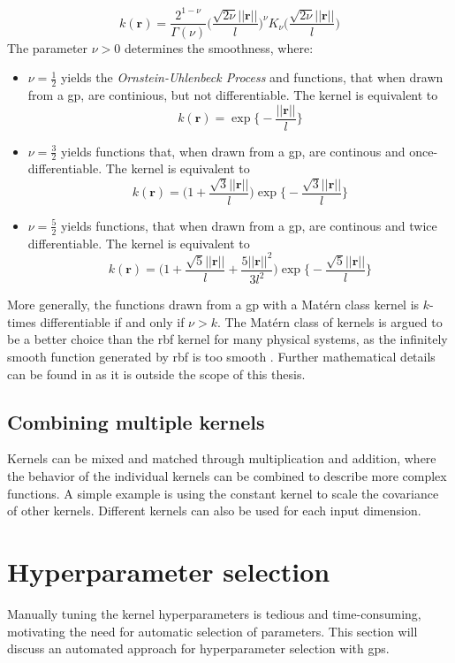 \begin{equation}\label{eq:kernel_matern}
    k(\boldsymbol{r}) = \frac{2^{1-\nu}}{\Gamma(\nu)}\bigg(\frac{\sqrt{2 \nu} ||\boldsymbol{r}||}{l} \bigg)^\nu K_\nu \bigg(\frac{\sqrt{2\nu} || \boldsymbol{r}||}{l} \bigg)
\end{equation}
The parameter $\nu > 0$ determines the smoothness, where:
\begin{itemize}
    \item $\nu=\frac{1}{2}$ yields the \textit{Ornstein-Uhlenbeck Process} and functions, that when drawn from a \acrshort{gp}, are continious, but not differentiable. The kernel is equivalent to $$k(\boldsymbol{r}) = \exp \big\{-\frac{||\boldsymbol{r}||}{l}\big\}$$
    \item $\nu=\frac{3}{2}$ yields functions that, when drawn from a \acrshort{gp}, are continous and once-differentiable. The kernel is equivalent to $$k(\boldsymbol{r}) = \big(1 + \frac{\sqrt{3} ||\boldsymbol{r}||}{l}\big) \exp\big\{- \frac{\sqrt{3} ||\boldsymbol{r}||}{l}\big\}$$
    \item $\nu=\frac{5}{2}$ yields functions, that when drawn from a \acrshort{gp},  are continous and twice differentiable. The kernel is equivalent to $$k(\boldsymbol{r}) = \big(1 + \frac{\sqrt{5} ||\boldsymbol{r}||}{l} + \frac{5 ||\boldsymbol{r}||^2}{3 l^2}\big) \exp\big\{- \frac{\sqrt{5} ||\boldsymbol{r}||}{l}\big\}$$
\end{itemize}
More generally, the functions drawn from a \acrshort{gp} with a Matérn class kernel is $k$-times differentiable if and only if $\nu > k$\cite{rasmussen}. The Matérn class of kernels is argued to be a better choice than the \acrshort{rbf} kernel for many physical systems, as the infinitely smooth function generated by \acrshort{rbf} is too smooth \cite{rasmussen}.
Further mathematical details can be found in \cite[sec.~4.2]{rasmussen} as it is outside the scope of this thesis.


\subsection{Combining multiple kernels}
Kernels can be mixed and matched through multiplication and addition, where the behavior of the individual kernels can be combined to describe more complex functions. A simple example is using the constant kernel to scale the covariance of other kernels. Different kernels can also be used for each input dimension.
\section{Hyperparameter selection}
Manually tuning the kernel hyperparameters is tedious and time-consuming, motivating the need for automatic selection of parameters. This section will discuss an automated approach for hyperparameter selection with \acrshort{gp}s.

